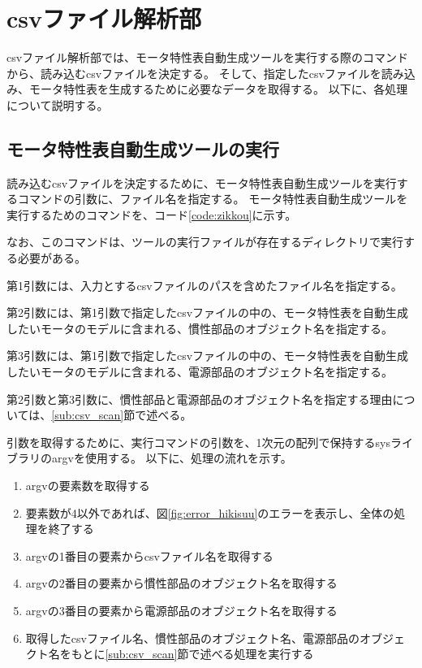 \section{csvファイル解析部}\label{csv_sec}
csvファイル解析部では、モータ特性表自動生成ツールを実行する際のコマンドから、読み込むcsvファイルを決定する。
そして、指定したcsvファイルを読み込み、モータ特性表を生成するために必要なデータを取得する。
以下に、各処理について説明する。
\subsection{モータ特性表自動生成ツールの実行}\label{sub:zikkou_tool}
読み込むcsvファイルを決定するために、モータ特性表自動生成ツールを実行するコマンドの引数に、ファイル名を指定する。
モータ特性表自動生成ツールを実行するためのコマンドを、コード\ref{code:zikkou}に示す。
\begin{figure}[t]
	
\end{figure}
なお、このコマンドは、ツールの実行ファイルが存在するディレクトリで実行する必要がある。

第1引数には、入力とするcsvファイルのパスを含めたファイル名を指定する。

第2引数には、第1引数で指定したcsvファイルの中の、モータ特性表を自動生成したいモータのモデルに含まれる、慣性部品のオブジェクト名を指定する。

第3引数には、第1引数で指定したcsvファイルの中の、モータ特性表を自動生成したいモータのモデルに含まれる、電源部品のオブジェクト名を指定する。

第2引数と第3引数に、慣性部品と電源部品のオブジェクト名を指定する理由については、\ref{sub:csv_scan}節で述べる。

引数を取得するために、実行コマンドの引数を、1次元の配列で保持するsysライブラリのargvを使用する。
以下に、処理の流れを示す。

\begin{enumerate}
    \item argvの要素数を取得する
    \item 要素数が4以外であれば、図\ref{fig:error_hikisuu}のエラーを表示し、全体の処理を終了する
    \item argvの1番目の要素からcsvファイル名を取得する
    \item argvの2番目の要素から慣性部品のオブジェクト名を取得する
    \item argvの3番目の要素から電源部品のオブジェクト名を取得する
    \item 取得したcsvファイル名、慣性部品のオブジェクト名、電源部品のオブジェクト名をもとに\ref{sub:csv_scan}節で述べる処理を実行する
\end{enumerate}

